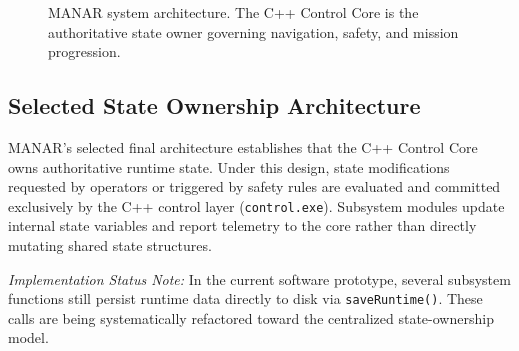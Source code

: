 \begin{figure}[t]
{%
}
\caption{MANAR system architecture. The C++ Control Core is the authoritative state owner governing navigation, safety, and mission progression.}
\label{fig:system_architecture}
\end{figure}

\subsection{Selected State Ownership Architecture}
MANAR's selected final architecture establishes that the C++ Control Core owns authoritative runtime state. Under this design, state modifications requested by operators or triggered by safety rules are evaluated and committed exclusively by the C++ control layer (\texttt{control.exe}). Subsystem modules update internal state variables and report telemetry to the core rather than directly mutating shared state structures.

\textit{Implementation Status Note:} In the current software prototype, several subsystem functions still persist runtime data directly to disk via \texttt{saveRuntime()}. These calls are being systematically refactored toward the centralized state-ownership model.

